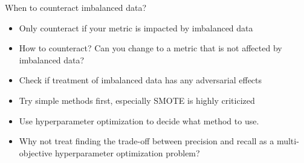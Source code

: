 \documentclass[11pt,compress,t,notes=noshow, xcolor=table]{beamer}
\begin{document}
\begin{frame}{When to counteract imbalanced data?}
\begin{itemize}
    \item Only counteract if your metric is impacted by imbalanced data
    \item How to counteract? Can you change to a metric that is not affected by imbalanced data?
    \item Check if treatment of imbalanced data has any adversarial effects 
    \item Try simple methods first, especially SMOTE is highly criticized 
    \item Use hyperparameter optimization to decide what method to use.
    \item Why not treat finding the trade-off between precision and recall as a multi-objective hyperparameter optimization problem?
\end{itemize}
    
\end{frame}

\endlecture
\end{document}
